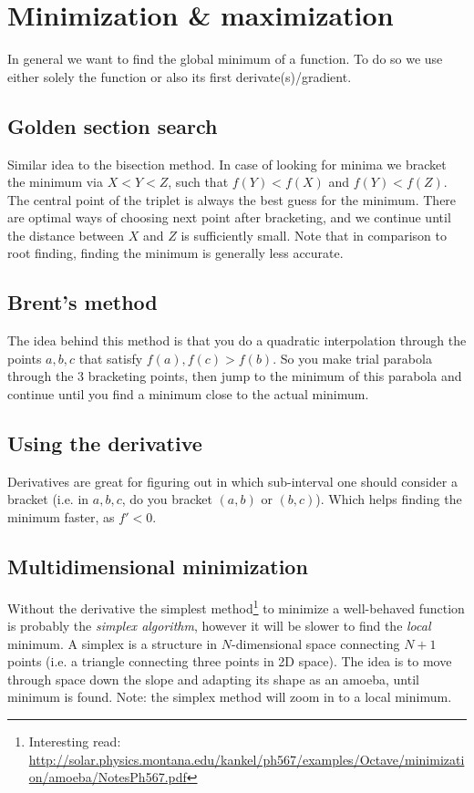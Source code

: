 \documentclass[a4paper]{article}
\begin{document}
\section{Minimization \& maximization}

In general we want to find the global minimum of a function. To do so we use either solely the function or also its first derivate(s)/gradient.

\subsection{Golden section search}

Similar idea to the bisection method. In case of looking for minima we bracket the minimum via $X < Y < Z$, such that $f(Y)<f(X)$ and $f(Y)<f(Z)$. The central point of the triplet is always the best guess for the minimum. There are optimal ways of choosing next point after bracketing, and we continue until the distance between $X$ and $Z$ is sufficiently small. Note that in comparison to root finding, finding the minimum is generally less accurate.

\subsection{Brent's method}

The idea behind this method is that you do a quadratic interpolation through the points $a, b, c$ that satisfy $f(a),f(c)>f(b)$. So you make trial parabola through the 3 bracketing points, then jump to the minimum of this parabola and continue until you find a minimum close to the actual minimum.

\subsection{Using the derivative}

Derivatives are great for figuring out in which sub-interval one should consider a bracket (i.e. in $a,b,c$, do you bracket $(a,b)$ or $(b,c)$). Which helps finding the minimum faster, as $f' < 0$.

\subsection{Multidimensional minimization}

Without the derivative the simplest method\footnote{Interesting read: \url{ http://solar.physics.montana.edu/kankel/ph567/examples/Octave/minimization/amoeba/NotesPh567.pdf}} to minimize a well-behaved function is probably the \textit{simplex algorithm}, however it will be slower to find the \textit{local} minimum. A simplex is a structure in $N$-dimensional space connecting $N+1$ points (i.e. a triangle connecting three points in 2D space). The idea is to move through space down the slope and adapting its shape as an amoeba, until minimum is found. Note: the simplex method will zoom in to a local minimum.
\end{document}
